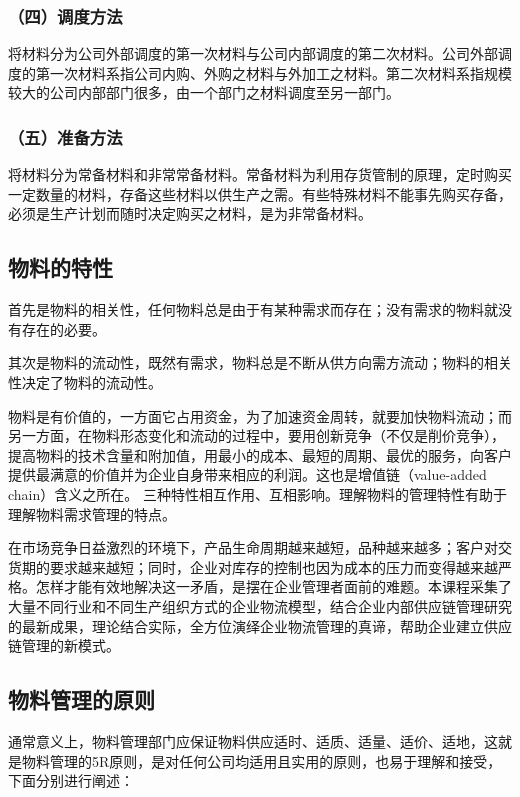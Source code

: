     \subsubsection {（四）调度方法}

    将材料分为公司外部调度的第一次材料与公司内部调度的第二次材料。公司外部调度的第一次材料系指公司内购、外购之材料与外加工之材料。第二次材料系指规模较大的公司内部部门很多，由一个部门之材料调度至另一部门。

    \subsubsection {（五）准备方法}

    将材料分为常备材料和非常常备材料。常备材料为利用存货管制的原理，定时购买一定数量的材料，存备这些材料以供生产之需。有些特殊材料不能事先购买存备，必须是生产计划而随时决定购买之材料，是为非常备材料。

\subsection { 物料的特性}

    首先是物料的相关性，任何物料总是由于有某种需求而存在；没有需求的物料就没有存在的必要。

    其次是物料的流动性，既然有需求，物料总是不断从供方向需方流动；物料的相关性决定了物料的流动性。

    物料是有价值的，一方面它占用资金，为了加速资金周转，就要加快物料流动；而另一方面，在物料形态变化和流动的过程中，要用创新竞争（不仅是削价竞争），提高物料的技术含量和附加值，用最小的成本、最短的周期、最优的服务，向客户提供最满意的价值并为企业自身带来相应的利润。这也是增值链（value-added chain）含义之所在。 三种特性相互作用、互相影响。理解物料的管理特性有助于理解物料需求管理的特点。

    在市场竞争日益激烈的环境下，产品生命周期越来越短，品种越来越多；客户对交货期的要求越来越短；同时，企业对库存的控制也因为成本的压力而变得越来越严格。怎样才能有效地解决这一矛盾，是摆在企业管理者面前的难题。本课程采集了大量不同行业和不同生产组织方式的企业物流模型，结合企业内部供应链管理研究的最新成果，理论结合实际，全方位演绎企业物流管理的真谛，帮助企业建立供应链管理的新模式。

\subsection { 物料管理的原则}

    通常意义上，物料管理部门应保证物料供应适时、适质、适量、适价、适地，这就是物料管理的5R原则，是对任何公司均适用且实用的原则，也易于理解和接受，下面分别进行阐述：

